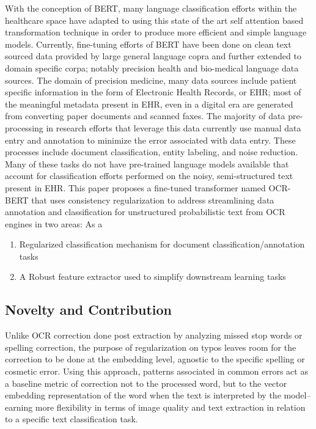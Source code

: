 \documentclass{article}
\begin{document}
With the conception of BERT, many language classification efforts within the healthcare space have adapted to using this state of the art self attention based transformation technique in order to produce more efficient and simple language models. Currently, fine-tuning efforts of BERT have been done on clean text sourced data provided by large general language copra and further extended to domain specific corpa; notably precision health and bio-medical language data sources. The domain of precision medicine, many data sources include patient specific information in the form of Electronic Health Records, or EHR; most of the meaningful metadata present in EHR, even in a digital era are generated from converting paper documents and scanned faxes. The majority of data pre-processing in research efforts that leverage this data currently use manual data entry and annotation to minimize the error associated with data entry. These processes include document classification, entity labeling, and noise reduction. Many of these tasks do not have pre-trained language models available that account for classification efforts performed on the noisy, semi-structured text present in EHR. This paper proposes a fine-tuned transformer named OCR-BERT that uses consistency regularization to address streamlining data annotation and classification for unstructured probabilistic text from OCR engines in two areas: As a 
\begin{enumerate}
    \item Regularized classification mechanism for document classification/annotation tasks
    \item  A Robust feature extractor used to simplify downstream learning tasks
\end{enumerate}

\subsection{Novelty and Contribution}
Unlike OCR correction done post extraction by analyzing missed stop words or spelling correction, the purpose of regularization on typos leaves room for the correction to be done at the embedding level, agnostic to the specific spelling or cosmetic error. Using this approach, patterns associated in common errors act as a baseline metric of correction not to the processed word, but to the vector embedding representation of the word when the text is interpreted by the model–earning more flexibility in terms of image quality and text extraction in relation to a specific text classification task.
\end{document}
